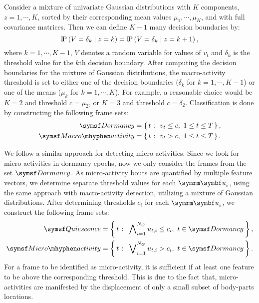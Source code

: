 Consider a mixture of univariate Gaussian distributions with $K$ components, $z=1, \cdots, K$, sorted by their corresponding mean values $\mu_1, \cdots, \mu_K$, and with full covariance matrices. Then we can define $K-1$ many decision boundaries by:
\begin{equation}
	\operatorname{\text{I\kern-0.15em P}} \left( V=\delta_k \;\middle|\; z=k \right) = \operatorname{\text{I\kern-0.15em P}} \left( V=\delta_k \;\middle|\; z=k+1 \right),
\end{equation}
where $k=1, \cdots, K-1$, $V$ denotes a random variable for values of $v_t$ and $\delta_k$ is the threshold value for the $k$th decision boundary.
After computing the decision boundaries for the mixture of Gaussian distributions, the macro-activity threshold is set to either one of the decision boundaries ($\delta_k$ for $k=1, \cdots, K-1$) or one of the means ($\mu_k$ for $k=1, \cdots, K$).
For example, a reasonable choice would be $K=2$ and threshold $c=\mu_2$, or $K=3$ and threshold $c=\delta_2$.
Classification is done by constructing the following frame sets:
\begin{equation}
	\begin{aligned}
		\Dormancy      & =\Set{t}{v_t \leq c, \ 1\leq t \leq T}, \\
		\MacroActivity & =\Set{t}{v_t>c, \ 1\leq t \leq T}.
	\end{aligned}
\end{equation}

We follow a similar approach for detecting micro-activities.
Since we look for micro-activities in dormancy epochs, now we only consider the frames from the set $\Dormancy$.
As micro-activity bouts are quantified by multiple feature vectors, we determine separate threshold values for each $\V{u}_i$, using the same approach with macro-activity detection, utilizing a mixture of Gaussian distributions.
After determining thresholds $c_i$ for each $\V{u}_i$, we construct the following frame sets:
\begin{equation}
	\begin{aligned}
		\Quiescence    & = \Set{t}{\bigwedge\nolimits_{i=1}^{N_G} u_{t,i} \leq c_i, \ t \in \Dormancy}, \\
		\MicroActivity & = \Set{t}{\bigvee\nolimits_{i=1}^{N_G} u_{t,i} > c_i, \ t \in \Dormancy}.
	\end{aligned}
\end{equation}
For a frame to be identified as micro-activity, it is sufficient if at least one feature to be above the corresponding threshold.
This is due to the fact that, micro-activities are manifested by the displacement of only a small subset of body-parts locations.

